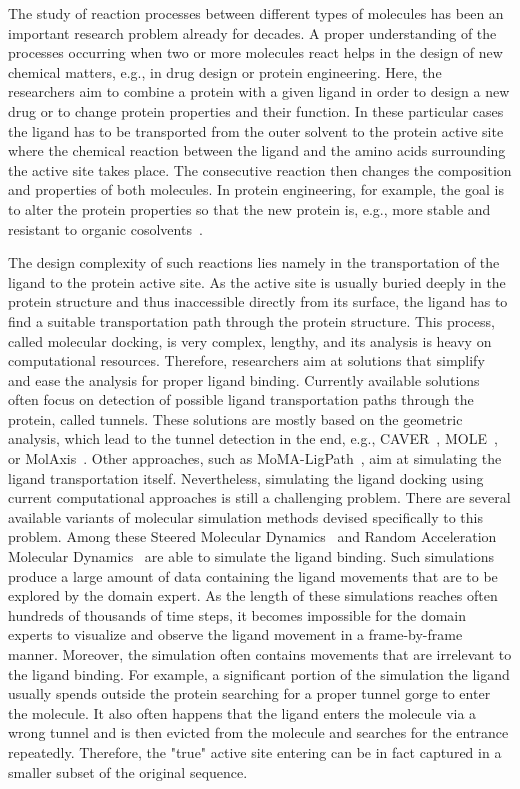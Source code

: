 \documentclass[twocolumn]{bmcart}%
\begin{document}
The study of reaction processes between different types of molecules has been an important research problem already for decades.
A proper understanding of the processes occurring when two or more molecules react helps in the design of new chemical matters, e.g., in drug design or protein engineering.
Here, the researchers aim to combine a protein with a given ligand in order to design a new drug or to change protein properties and their function.
In these particular cases the ligand has to be transported from the outer solvent to the protein active site where the chemical reaction between the ligand and the amino acids surrounding the active site takes place.
The consecutive reaction then changes the composition and properties of both molecules. 
In protein engineering, for example, the goal is to alter the protein properties so that the new protein is, e.g., more stable and resistant to organic cosolvents~\cite{Koudelakova2013}.

The design complexity of such reactions lies namely in the transportation of the ligand to the protein active site.
As the active site is usually buried deeply in the protein structure and thus inaccessible directly from its surface, the ligand has to find a suitable transportation path through the protein structure.
This process, called molecular docking, is very complex, lengthy, and its analysis is heavy on computational resources. 
Therefore, researchers aim at solutions that simplify and ease the analysis for proper ligand binding.
Currently available solutions often focus on detection of possible ligand transportation paths through the protein, called tunnels.
These solutions are mostly based on the geometric analysis, which lead to the tunnel detection in the end, e.g., CAVER~\cite{Chovancova2012}, MOLE~\cite{Sehnal2013}, or MolAxis~\cite{Yaffe2008}.
Other approaches, such as MoMA-LigPath~\cite{Devaurs}, aim at simulating the ligand transportation itself.
Nevertheless, simulating the ligand docking using current computational approaches is still a challenging problem.
There are several available variants of molecular simulation methods devised specifically to this problem. 
Among these Steered Molecular Dynamics~\cite{Isralewitz} and Random Acceleration Molecular Dynamics~\cite{Ludemann} are able to simulate the ligand binding. 
Such simulations produce a large amount of data containing the ligand movements that are to be explored by the domain expert.
As the length of these simulations reaches often hundreds of thousands of time steps, it becomes impossible for the domain experts to visualize and observe the ligand movement in a frame-by-frame manner.
Moreover, the simulation often contains movements that are irrelevant to the ligand binding.
For example, a significant portion of the simulation the ligand usually spends outside the protein searching for a proper tunnel gorge to enter the molecule. 
It also often happens that the ligand enters the molecule via a wrong tunnel and is then evicted from the molecule and searches for the entrance repeatedly.
Therefore, the "true" active site entering can be in fact captured in a smaller subset of the original sequence.
\end{document}
